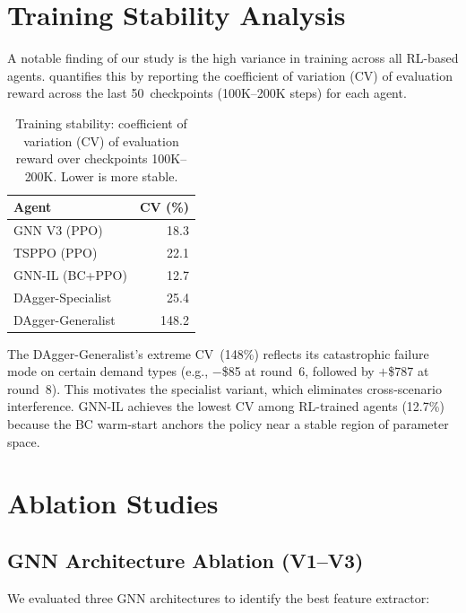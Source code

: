 \section{Training Stability Analysis}\label{app:stability}

A notable finding of our study is the high variance in training across
all RL-based agents.  quantifies this by reporting
the coefficient of variation (CV) of evaluation reward across the last
50~checkpoints (100K--200K steps) for each agent.

\begin{table}[htbp]
\centering
\caption{Training stability: coefficient of variation (CV) of evaluation
reward over checkpoints 100K--200K. Lower is more stable.}
\label{tab:stability}
\small
\begin{tabular}{lr}
\toprule
\textbf{Agent}         & \textbf{CV (\%)} \\
\midrule
GNN V3 (PPO)           & 18.3  \\
TSPPO (PPO)            & 22.1  \\
GNN-IL (BC+PPO)        & 12.7  \\
DAgger-Specialist      & 25.4  \\
DAgger-Generalist      & 148.2 \\
\bottomrule
\end{tabular}
\end{table}

The DAgger-Generalist's extreme CV~(148\%) reflects its catastrophic failure
mode on certain demand types (e.g., $-$\$85 at round~6, followed by
$+$\$787 at round~8). This motivates the specialist variant, which
eliminates cross-scenario interference. GNN-IL achieves the lowest CV
among RL-trained agents (12.7\%) because the BC warm-start anchors the
policy near a stable region of parameter space.


\section{Ablation Studies}\label{app:ablation}

\subsection{GNN Architecture Ablation (V1--V3)}

We evaluated three GNN architectures to identify the best feature extractor:

